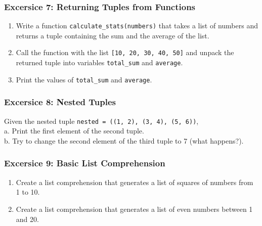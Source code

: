 \documentclass[
  letterpaper,
  DIV=11,
  numbers=noendperiod]{scrreprt}
\providecommand{\tightlist}{%
  \setlength{\itemsep}{0pt}\setlength{\parskip}{0pt}}\usepackage{longtable,booktabs,array}
\begin{document}
\hypertarget{excersice-7-returning-tuples-from-functions}{%
\subsubsection{Excersice 7: Returning Tuples from
Functions}\label{excersice-7-returning-tuples-from-functions}}

\begin{enumerate}
\def\labelenumi{\alph{enumi}.}
\tightlist
\item
  Write a function \texttt{calculate\_stats(numbers)} that takes a list
  of numbers and returns a tuple containing the sum and the average of
  the list.\\
\item
  Call the function with the list \texttt{{[}10,\ 20,\ 30,\ 40,\ 50{]}}
  and unpack the returned tuple into variables \texttt{total\_sum} and
  \texttt{average}.\\
\item
  Print the values of \texttt{total\_sum} and \texttt{average}.
\end{enumerate}

\hypertarget{excersice-8-nested-tuples}{%
\subsubsection{Excersice 8: Nested
Tuples}\label{excersice-8-nested-tuples}}

Given the nested tuple
\texttt{nested\ =\ ((1,\ 2),\ (3,\ 4),\ (5,\ 6))},\\
a. Print the first element of the second tuple.\\
b. Try to change the second element of the third tuple to 7 (what
happens?).

\hypertarget{excersice-9-basic-list-comprehension}{%
\subsubsection{Excersice 9: Basic List
Comprehension}\label{excersice-9-basic-list-comprehension}}

\begin{enumerate}
\def\labelenumi{\alph{enumi}.}
\tightlist
\item
  Create a list comprehension that generates a list of squares of
  numbers from 1 to 10.\\
\item
  Create a list comprehension that generates a list of even numbers
  between 1 and 20.
\end{enumerate}
\end{document}
